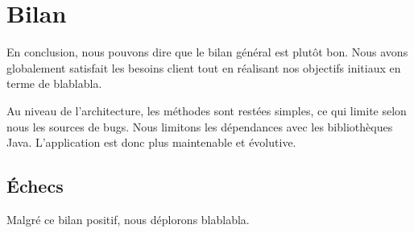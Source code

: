 \section{Bilan}

En conclusion, nous pouvons dire que le bilan général est plutôt bon. Nous avons globalement satisfait les besoins client tout en réalisant nos objectifs initiaux en terme de blablabla.

Au niveau de l'architecture, les méthodes sont restées simples, ce qui limite selon nous les sources de bugs. Nous limitons les dépendances avec les bibliothèques Java. L'application est donc plus maintenable et évolutive.

\subsection{Échecs}

Malgré ce bilan positif, nous déplorons blablabla.

